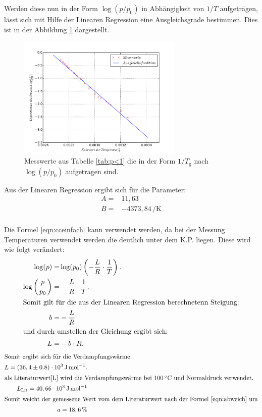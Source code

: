 \FloatBarrier
Werden diese nun in der Form $\log(p/p_\mathrm{0})$ in Abhängigkeit von
$1/T$ aufgeträgen,
lässt sich mit Hilfe der Linearen Regression eine
Ausgleichsgrade bestimmen.
Dies ist in der Abbildung \ref{abb:plot1} dargestellt.
\begin{figure}
  \centering
  \includegraphics[width=0.7\textwidth]{plot1.pdf}
  \caption{Messwerte aus Tabelle \ref{tab:p<1} die in der Form $1/T_\mathrm{g}$ nach $\log(p/p_\mathrm{0})$ aufgetragen sind.}
  \label{abb:plot1}
\end{figure}
\FloatBarrier
Aus der Linearen Regression ergibt sich für die Parameter:
\begin{align*}
  A=&   11,63\\
  B=&  -4373,84\,\si{\per\kelvin}
\end{align*}
\\
Die Formel \eqref{eqn:cceinfach} kann verwendet
werden, da bei der Messung Temperaturen verwendet
werden die deutlich unter dem K.P. liegen.
Diese wird wie folgt verändert:
\begin{align}
\log(p)=& \log(p_\mathrm{0})\left(-\frac{L}{R}\cdot\frac{1}{T}\right).\\
\log\left(\frac{p}{p_\mathrm{0}}\right)=&-\frac{L}{R}\cdot\frac{1}{T}.\\
\intertext{Somit gilt für die aus der Linearen Regression berechnetenn Steigung:}
b=&-\frac{L}{R}\\
\intertext{und durch umstellen der Gleichung ergibt sich:}
L=&-b\cdot R.\\
\end{align}
\begin{align*}
\intertext{Somit ergibt sich für die Verdampfungswärme }
L=(36,4\pm0.8)\cdot 10^3 \,\si{\joule\per\mol}.\\
\intertext{als Literaturwert\cite{L} wird die Verdampfungswärme bei $100\,\si{\degreeCelsius}$ und Normaldruck verwendet.}
L_\mathrm{Lit}= 40,66\cdot 10^3 \,\si{\joule\per\mol}\\
\intertext{Somit weicht der gemessene Wert vom dem Literaturwert nach der Formel \eqref{eqn:abweich} um}
a=18,6 \,\si{\percent}
\end{align*}
